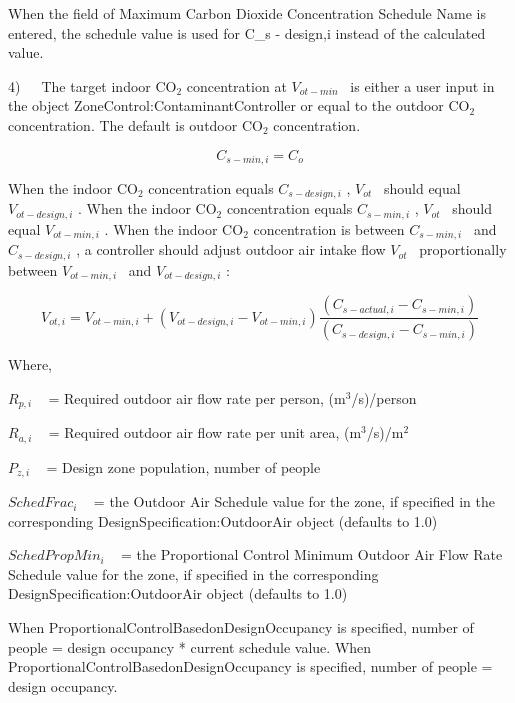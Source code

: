 When the field of Maximum Carbon Dioxide Concentration Schedule Name is entered, the schedule value is used for {C_{s - design,i}} instead of the calculated value. 

4)~~~The target indoor CO\(_{2}\) concentration at \({V_{ot - min}}\) ~is either a user input in the object ZoneControl:ContaminantController or equal to the outdoor CO\(_{2}\) concentration. The default is outdoor CO\(_{2}\) concentration.

\begin{equation}
{C_{s - min,i}} = {C_o}
\end{equation}

When the indoor CO\(_{2}\) concentration equals \({C_{s - design,i}}\) , \({V_{ot}}\) ~should equal \({V_{ot - design,i}}\) . When the indoor CO\(_{2}\) concentration equals \({C_{s - min,i}}\) , \({V_{ot}}\) ~should equal \({V_{ot - min,i}}\) . When the indoor CO\(_{2}\) concentration is between \({C_{s - min,i}}\) ~and \({C_{s - design,i}}\) , a controller should adjust outdoor air intake flow \({V_{ot}}\) ~proportionally between \({V_{ot - min,i}}\) ~and \({V_{ot - design,i}}\) :

\begin{equation}
{V_{ot,i}} = {V_{ot - min,i}} + ({V_{ot - design,i}} - {V_{ot - min,i}})\frac{{({C_{s - actual,i}} - {C_{s - min,i}})}}{{({C_{s - design,i}} - {C_{s - min,i}})}}
\end{equation}

Where,

\({R_{p,i}}\) ~ = Required outdoor air flow rate per person, (m\(^{3}\)/s)/person

\({R_{a,i}}\) ~ = Required outdoor air flow rate per unit area, (m\(^{3}\)/s)/m\(^{2}\)

\({P_{z,i}}\) ~ = Design zone population, number of people

\({SchedFrac_i}\) ~ = the Outdoor Air Schedule value for the zone, if specified in the corresponding DesignSpecification:OutdoorAir object (defaults to 1.0)

\({SchedPropMin_i}\) ~ = the Proportional Control Minimum Outdoor Air Flow Rate Schedule value for the zone, if specified in the corresponding DesignSpecification:OutdoorAir object (defaults to 1.0)

When ProportionalControlBasedonDesignOccupancy is specified, number of people = design occupancy * current schedule value. When ProportionalControlBasedonDesignOccupancy is specified, number of people = design occupancy.

